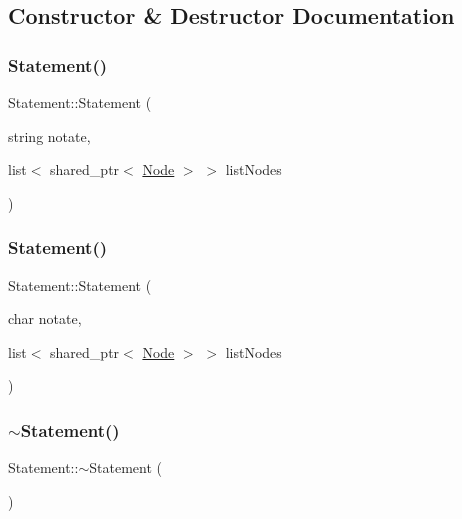 \subsection{Constructor \& Destructor Documentation}
\mbox{\label{class_statement_a63f078944310c19057bdd7c25aa1b5a3}} 
\subsubsection{\texorpdfstring{Statement()}{Statement()}\hspace{0.1cm}{\footnotesize\ttfamily [1/2]}}
{\footnotesize\ttfamily Statement\+::\+Statement (\begin{DoxyParamCaption}\item[{string}]{notate,  }\item[{list$<$ shared\+\_\+ptr$<$ \hyperlink{class_node}{Node} $>$ $>$}]{list\+Nodes }\end{DoxyParamCaption})}

\mbox{\label{class_statement_a6f4d56b4180183819b76f01209acb3d1}} 
\subsubsection{\texorpdfstring{Statement()}{Statement()}\hspace{0.1cm}{\footnotesize\ttfamily [2/2]}}
{\footnotesize\ttfamily Statement\+::\+Statement (\begin{DoxyParamCaption}\item[{char}]{notate,  }\item[{list$<$ shared\+\_\+ptr$<$ \hyperlink{class_node}{Node} $>$ $>$}]{list\+Nodes }\end{DoxyParamCaption})}

\mbox{\label{class_statement_a4ca9db7feff843e91b1f2200fc77a784}} 
\subsubsection{\texorpdfstring{$\sim$\+Statement()}{~Statement()}}
{\footnotesize\ttfamily Statement\+::$\sim$\+Statement (\begin{DoxyParamCaption}{ }\end{DoxyParamCaption})\hspace{0.3cm}{\ttfamily [override]}}



